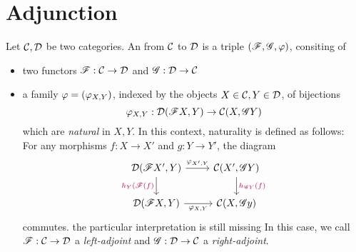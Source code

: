 \section{Adjunction}
\begin{defn}
Let $\mathcal{C},\mathcal{D}$ be two categories. An  from $\mathcal{C}$ to $\mathcal{D}$ is a triple $(\mathscr{F},\mathscr{G},\varphi)$, consiting of 
\begin{itemize}
    \item two functors $\mathscr{F}:\mathcal{C} \to \mathcal{D}$ and $\mathscr{G}: \mathcal{D} \to \mathcal{C}$
    \item a family $\varphi=(\varphi_{X,Y})$, indexed by the objects $X\in \mathcal{C},Y\in \mathcal{D}$, of bijections 
    \[
    \varphi_{X,Y}:\mathcal{D}(\mathscr{F} X,Y)\to \mathcal{C}(X,\mathscr{G} Y)
    \]
    which are \emph{natural} in $X,Y$. In this context, naturality is defined as follows: \\
    For any morphisms $f:X\to X'$ and $g:Y\to Y'$, the diagram 
    \[
    \begin{tikzcd}
    \dcat(\ffunc X',Y) \ar{r}{\pphi_{X',Y}} \ar[swap]{d}{\coms h_Y(\ffunc(f)\come} & \ccat(X',\gfunc Y)\ar{d}{\coms h_{\gfunc Y}(f)\come}\\ \dcat(\ffunc X, Y)\ar[swap]{r}{\pphi_{X,Y}}&\ccat(X,\gfunc y)
    \end{tikzcd}
    \]
    commutes. \coms the particular interpretation is still missing\come 
    In this case, we call $\mathscr{F}:\mathcal{C} \to \mathcal{D}$ a \emph{left-adjoint} and $\mathscr{G}:\mathcal{D} \to \mathcal{C}$ a \emph{right-adjoint}.
\end{itemize}
\end{defn}
